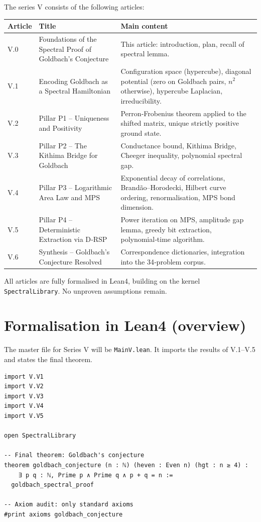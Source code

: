 \documentclass[11pt,a4paper]{article}
\begin{document}
The series V consists of the following articles:

\begin{center}
\begin{tabular}{@{}llp{8cm}@{}}
\toprule
\textbf{Article} & \textbf{Title} & \textbf{Main content} \\
\midrule
V.0 & Foundations of the Spectral Proof of Goldbach's Conjecture & This article: introduction, plan, recall of spectral lemma. \\
V.1 & Encoding Goldbach as a Spectral Hamiltonian & Configuration space (hypercube), diagonal potential (zero on Goldbach pairs, \(n^2\) otherwise), hypercube Laplacian, irreducibility. \\
V.2 & Pillar P1 – Uniqueness and Positivity & Perron‑Frobenius theorem applied to the shifted matrix, unique strictly positive ground state. \\
V.3 & Pillar P2 – The Kithima Bridge for Goldbach & Conductance bound, Kithima Bridge, Cheeger inequality, polynomial spectral gap. \\
V.4 & Pillar P3 – Logarithmic Area Law and MPS & Exponential decay of correlations, Brandão–Horodecki, Hilbert curve ordering, renormalisation, MPS bond dimension. \\
V.5 & Pillar P4 – Deterministic Extraction via D‑RSP & Power iteration on MPS, amplitude gap lemma, greedy bit extraction, polynomial‑time algorithm. \\
V.6 & Synthesis – Goldbach's Conjecture Resolved & Correspondence dictionaries, integration into the 34‑problem corpus. \\
\bottomrule
\end{tabular}
\end{center}

All articles are fully formalised in Lean4, building on the kernel \texttt{SpectralLibrary}. No unproven assumptions remain.

\section{Formalisation in Lean4 (overview)}

The master file for Series V will be \texttt{MainV.lean}. It imports the results of V.1–V.5 and states the final theorem.

\begin{lstlisting}[style=lean, caption={MainV.lean (sketch)}]
import V.V1
import V.V2
import V.V3
import V.V4
import V.V5

open SpectralLibrary

-- Final theorem: Goldbach's conjecture
theorem goldbach_conjecture (n : ℕ) (heven : Even n) (hgt : n ≥ 4) :
    ∃ p q : ℕ, Prime p ∧ Prime q ∧ p + q = n :=
  goldbach_spectral_proof

-- Axiom audit: only standard axioms
#print axioms goldbach_conjecture
\end{lstlisting}
\end{document}
